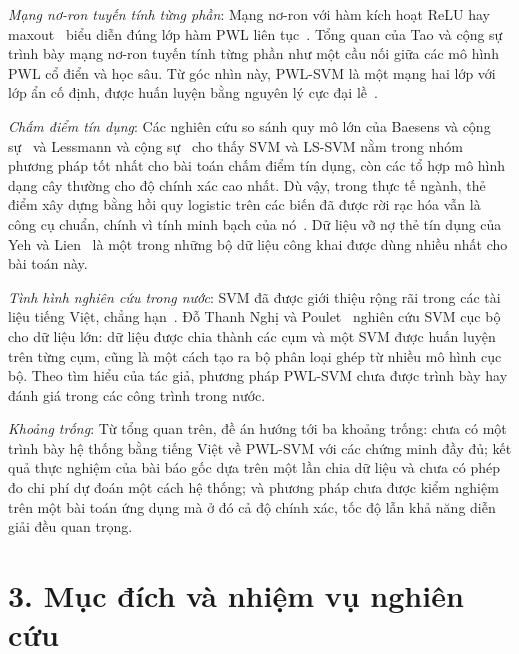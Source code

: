 \emph{Mạng nơ-ron tuyến tính từng phần}: Mạng nơ-ron với hàm kích hoạt ReLU hay maxout~\cite{goodfellow2013} biểu diễn đúng lớp hàm PWL liên tục~\cite{arora2018}. Tổng quan của Tao và cộng sự~\cite{tao2022} trình bày mạng nơ-ron tuyến tính từng phần như một cầu nối giữa các mô hình PWL cổ điển và học sâu. Từ góc nhìn này, PWL-SVM là một mạng hai lớp với lớp ẩn cố định, được huấn luyện bằng nguyên lý cực đại lề~\cite{suykens1999mlp}.

\emph{Chấm điểm tín dụng}: Các nghiên cứu so sánh quy mô lớn của Baesens và cộng sự~\cite{baesens2003} và Lessmann và cộng sự~\cite{lessmann2015} cho thấy SVM và LS-SVM nằm trong nhóm phương pháp tốt nhất cho bài toán chấm điểm tín dụng, còn các tổ hợp mô hình dạng cây thường cho độ chính xác cao nhất. Dù vậy, trong thực tế ngành, thẻ điểm xây dựng bằng hồi quy logistic trên các biến đã được rời rạc hóa vẫn là công cụ chuẩn, chính vì tính minh bạch của nó~\cite{thomas2002}. Dữ liệu vỡ nợ thẻ tín dụng của Yeh và Lien~\cite{yeh2009} là một trong những bộ dữ liệu công khai được dùng nhiều nhất cho bài toán này.

\emph{Tình hình nghiên cứu trong nước}: SVM đã được giới thiệu rộng rãi trong các tài liệu tiếng Việt, chẳng hạn~\cite{vuhuutiep2018}. Đỗ Thanh Nghị và Poulet~\cite{do2017} nghiên cứu SVM cục bộ cho dữ liệu lớn: dữ liệu được chia thành các cụm và một SVM được huấn luyện trên từng cụm, cũng là một cách tạo ra bộ phân loại ghép từ nhiều mô hình cục bộ. Theo tìm hiểu của tác giả, phương pháp PWL-SVM chưa được trình bày hay đánh giá trong các công trình trong nước.

\emph{Khoảng trống}: Từ tổng quan trên, đề án hướng tới ba khoảng trống: chưa có một trình bày hệ thống bằng tiếng Việt về PWL-SVM với các chứng minh đầy đủ; kết quả thực nghiệm của bài báo gốc dựa trên một lần chia dữ liệu và chưa có phép đo chi phí dự đoán một cách hệ thống; và phương pháp chưa được kiểm nghiệm trên một bài toán ứng dụng mà ở đó cả độ chính xác, tốc độ lẫn khả năng diễn giải đều quan trọng.

\section*{3. Mục đích và nhiệm vụ nghiên cứu}

